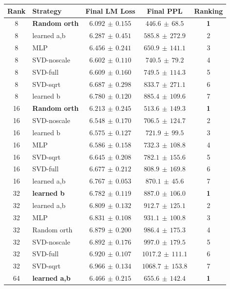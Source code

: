 \begin{table}[h!]
\centering
\small
\begin{tabular}{c l c c c}
\hline
Rank & Strategy & Final LM Loss & Final PPL & Ranking \\
\hline
8 & \textbf{Random orth} & \textbf{$6.092\,\pm\,0.155$} & \textbf{$446.6\,\pm\,68.5$} & \textbf{1} \\
8 & learned a,b & $6.287\,\pm\,0.451$ & $585.8\,\pm\,272.9$ & 2 \\
8 & MLP & $6.456\,\pm\,0.241$ & $650.9\,\pm\,141.1$ & 3 \\
8 & SVD-noscale & $6.602\,\pm\,0.110$ & $740.5\,\pm\,79.2$ & 4 \\
8 & SVD-full & $6.609\,\pm\,0.160$ & $749.5\,\pm\,114.3$ & 5 \\
8 & SVD-sqrt & $6.687\,\pm\,0.298$ & $833.7\,\pm\,271.1$ & 6 \\
8 & learned b & $6.780\,\pm\,0.120$ & $885.4\,\pm\,109.6$ & 7 \\
\hline
16 & \textbf{Random orth} & \textbf{$6.213\,\pm\,0.245$} & \textbf{$513.6\,\pm\,149.3$} & \textbf{1} \\
16 & SVD-noscale & $6.548\,\pm\,0.170$ & $706.5\,\pm\,124.7$ & 2 \\
16 & learned b & $6.575\,\pm\,0.127$ & $721.9\,\pm\,99.5$ & 3 \\
16 & MLP & $6.586\,\pm\,0.158$ & $732.3\,\pm\,108.8$ & 4 \\
16 & SVD-sqrt & $6.645\,\pm\,0.208$ & $782.1\,\pm\,155.6$ & 5 \\
16 & SVD-full & $6.677\,\pm\,0.212$ & $808.9\,\pm\,169.8$ & 6 \\
16 & learned a,b & $6.767\,\pm\,0.053$ & $870.1\,\pm\,45.6$ & 7 \\
\hline
32 & \textbf{learned b} & \textbf{$6.782\,\pm\,0.119$} & \textbf{$887.0\,\pm\,106.0$} & \textbf{1} \\
32 & learned a,b & $6.809\,\pm\,0.132$ & $912.7\,\pm\,125.1$ & 2 \\
32 & MLP & $6.831\,\pm\,0.108$ & $931.1\,\pm\,100.8$ & 3 \\
32 & Random orth & $6.879\,\pm\,0.200$ & $986.4\,\pm\,175.3$ & 4 \\
32 & SVD-noscale & $6.892\,\pm\,0.176$ & $997.0\,\pm\,179.5$ & 5 \\
32 & SVD-full & $6.920\,\pm\,0.107$ & $1017.2\,\pm\,111.1$ & 6 \\
32 & SVD-sqrt & $6.966\,\pm\,0.134$ & $1068.7\,\pm\,153.8$ & 7 \\
\hline
64 & \textbf{learned a,b} & \textbf{$6.466\,\pm\,0.215$} & \textbf{$655.6\,\pm\,142.4$} & \textbf{1} \\

\end{tabular}
\end{table}
